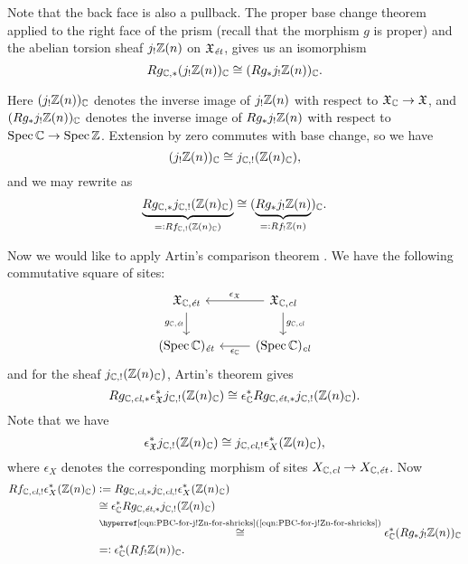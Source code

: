 Note that the back face is also a pullback. The proper base change theorem
\cite[Exposé XII, Theéorème 5.1]{SGA4} applied to the right face of the prism
(recall that the morphism $g$ is proper) and the abelian torsion sheaf
$j_! \mathbb{Z} (n)$ on $\mathfrak{X}_\text{\it ét}$, gives us an isomorphism
\begin{equation}
  \label{eqn:PBC-for-j!Zn}
  R g_{\mathbb{C}, *} (j_! \mathbb{Z} (n))_{\mathbb{C}} \cong (R g_* j_! \mathbb{Z} (n))_{\mathbb{C}}.
\end{equation}

Here $(j_! \mathbb{Z} (n))_{\mathbb{C}}$ denotes the inverse image of $j_! \mathbb{Z} (n)$ with respect
to $\mathfrak{X}_{\mathbb{C}} \to \mathfrak{X}$, and $(R g_* j_! \mathbb{Z} (n))_{\mathbb{C}}$ denotes
the inverse image of $R g_* j_! \mathbb{Z} (n)$ with respect to
$\operatorname{Spec} \mathbb{C} \to \operatorname{Spec} \mathbb{Z}$. Extension by zero commutes with base change, so we
have
$$(j_! \mathbb{Z} (n))_{\mathbb{C}} \cong j_{\mathbb{C}, !} (\mathbb{Z} (n)_{\mathbb{C}}),$$
and we may rewrite  as
\begin{equation}
  \label{eqn:PBC-for-j!Zn-for-shrieks}
  \underbrace{R g_{\mathbb{C}, *} j_{\mathbb{C}, !} (\mathbb{Z} (n)_{\mathbb{C}})}_{=\mathrel{\mathop:} R f_{\mathbb{C},!} (\mathbb{Z} (n)_{\mathbb{C}})} \cong
  (\underbrace{R g_* j_! \mathbb{Z} (n)}_{=\mathrel{\mathop:} R f_! \mathbb{Z} (n)})_{\mathbb{C}}.
\end{equation}

Now we would like to apply Artin's comparison theorem
\cite[Exposé XVI, Théorème 4.1]{SGA4}. We have the following commutative square
of sites:
\[ \begin{tikzcd}
    \mathfrak{X}_{\CC,\text{\it ét}}\ar{d}[swap]{g_{\CC,\text{\it ét}}} & \mathfrak{X}_{\CC,\text{\it cl}} \ar{l}[swap]{\epsilon_\mathfrak{X}}\ar{d}{g_{\CC,\text{\it cl}}} \\
    (\Spec \CC)_\text{\it ét} & (\Spec \CC)_\text{\it cl}\ar{l}{\epsilon_\CC}
  \end{tikzcd} \]
and for the sheaf $j_{\mathbb{C},!} (\mathbb{Z} (n)_{\mathbb{C}})$, Artin's theorem gives
\[ R g_{\mathbb{C},\text{\it cl},*} \epsilon_\mathfrak{X}^* j_{\mathbb{C},!} (\mathbb{Z} (n)_{\mathbb{C}}) \cong
  \epsilon_{\mathbb{C}}^* R g_{\mathbb{C},\text{\it ét},*} j_{\mathbb{C},!} (\mathbb{Z} (n)_{\mathbb{C}}). \]
Note that we have
\[ \epsilon_\mathfrak{X}^* j_{\mathbb{C},!} (\mathbb{Z} (n)_{\mathbb{C}}) \cong
  j_{\mathbb{C}, \text{\it cl}, !} \epsilon_X^* (\mathbb{Z} (n)_{\mathbb{C}}), \]
where $\epsilon_X$ denotes the corresponding morphism of sites
$X_{\mathbb{C},\text{\it cl}} \to X_{\mathbb{C},\text{\it ét}}$. Now
\begin{align*}
  R f_{\CC, \text{\it cl}, !} \epsilon_X^* (\ZZ (n)_\CC) & \dfn R g_{\CC,\text{\it cl},*} j_{\CC, \text{\it cl}, !} \epsilon_X^* (\ZZ (n)_\CC)\\
                                                         & \isom \epsilon_\CC^* R g_{\CC,\text{\it ét},*} j_{\CC,!} (\ZZ (n)_\CC) \\
                                                         & \stackrel{\text{\eqnref{eqn:PBC-for-j!Zn-for-shrieks}}}{\isom} \epsilon_\CC^* (R g_* j_! \ZZ (n))_\CC \\
                                                         & \rdfn \epsilon_\CC^* (R f_! \ZZ (n))_\CC.
\end{align*}

